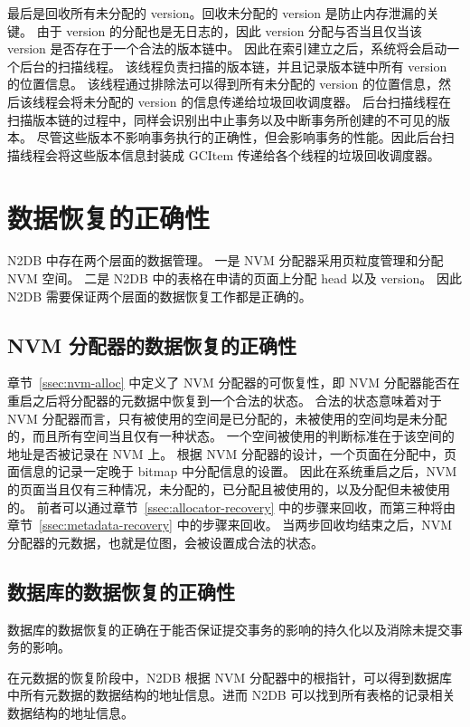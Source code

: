 最后是回收所有未分配的 version。回收未分配的 version 是防止内存泄漏的关键。
由于 version 的分配也是无日志的，因此 version 分配与否当且仅当该 version 是否存在于一个合法的版本链中。
因此在索引建立之后，系统将会启动一个后台的扫描线程。
该线程负责扫描的版本链，并且记录版本链中所有 version 的位置信息。
该线程通过排除法可以得到所有未分配的 version 的位置信息，然后该线程会将未分配的 version 的信息传递给垃圾回收调度器。
后台扫描线程在扫描版本链的过程中，同样会识别出中止事务以及中断事务所创建的不可见的版本。
尽管这些版本不影响事务执行的正确性，但会影响事务的性能。因此后台扫描线程会将这些版本信息封装成 GCItem 传递给各个线程的垃圾回收调度器。

\section{数据恢复的正确性}

N2DB 中存在两个层面的数据管理。
一是 NVM 分配器采用页粒度管理和分配 NVM 空间。
二是 N2DB 中的表格在申请的页面上分配 head 以及 version。
因此 N2DB 需要保证两个层面的数据恢复工作都是正确的。

\subsection{NVM 分配器的数据恢复的正确性}

章节~\ref{ssec:nvm-alloc} 中定义了 NVM 分配器的可恢复性，即 NVM 分配器能否在重启之后将分配器的元数据中恢复到一个合法的状态。
合法的状态意味着对于 NVM 分配器而言，只有被使用的空间是已分配的，未被使用的空间均是未分配的，而且所有空间当且仅有一种状态。
一个空间被使用的判断标准在于该空间的地址是否被记录在 NVM 上。
根据 NVM 分配器的设计，一个页面在分配中，页面信息的记录一定晚于 bitmap 中分配信息的设置。
因此在系统重启之后，NVM 的页面当且仅有三种情况，未分配的，已分配且被使用的，以及分配但未被使用的。
前者可以通过章节~\ref{ssec:allocator-recovery} 中的步骤来回收，而第三种将由章节~\ref{ssec:metadata-recovery} 中的步骤来回收。
当两步回收均结束之后，NVM 分配器的元数据，也就是位图，会被设置成合法的状态。

\subsection{数据库的数据恢复的正确性}

数据库的数据恢复的正确在于能否保证提交事务的影响的持久化以及消除未提交事务的影响。

在元数据的恢复阶段中，N2DB 根据 NVM 分配器中的根指针，可以得到数据库中所有元数据的数据结构的地址信息。进而 N2DB 可以找到所有表格的记录相关数据结构的地址信息。

